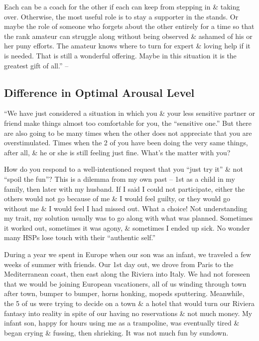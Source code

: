 \documentclass{article}
\numberwithin{equation}{section}
\begin{document}
Each can be a coach for the other if each can keep from stepping in \& taking over. Otherwise, the most useful role is to stay a supporter in the stands. Or maybe the role of someone who forgets about the other entirely for a time so that the rank amateur can struggle along without being observed \& ashamed of his or her puny efforts. The amateur knows where to turn for expert \& loving help if it is needed. That is still a wonderful offering. Maybe in this situation it is the greatest gift of all.'' -- \cite[pp. 182---184]{Aron2013}

\subsection{Difference in Optimal Arousal Level}
``We have just considered a situation in which you \& your less sensitive partner or friend make things almost too comfortable for you, the ``sensitive one.'' But there are also going to be many times when the other does not appreciate that you are overstimulated. Times when the 2 of you have been doing the very same things, after all, \& he or she is still feeling just fine. What's the matter with you?

How do you respond to a well-intentioned request that you ``just try it'' \& not ``spoil the fun''? This is a dilemma from my own past -- 1st as a child in my family, then later with my husband. If I said I could not participate, either the others would not go because of me \& I would feel guilty, or they would go without me \& I would feel I had missed out. What a choice! Not understanding my trait, my solution usually was to go along with what was planned. Sometimes it worked out, sometimes it was agony, \& sometimes I ended up sick. No wonder many HSPs lose touch with their ``authentic self.''

During a year we spent in Europe when our son was an infant, we traveled a few weeks of summer with friends. Our 1st day out, we drove from Paris to the Mediterranean coast, then east along the Riviera into Italy. We had not foreseen that we would be joining European vacationers, all of us winding through town after town, bumper to bumper, horns honking, mopeds sputtering. Meanwhile, the 5 of us were trying to decide on a town \& a hotel that would turn our Riviera fantasy into reality in spite of our having no reservations \& not much money. My infant son, happy for hours using me as a trampoline, was eventually tired \& began crying \& fussing, then shrieking. It was not much fun by sundown.
\end{document}
